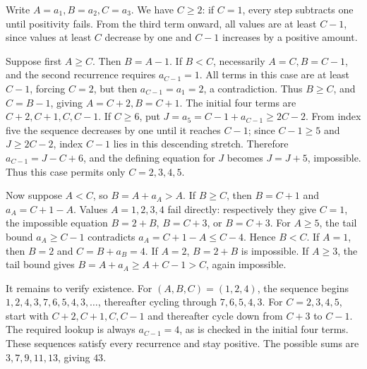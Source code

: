 Write $A=a_1,B=a_2,C=a_3$. We have $C\ge2$: if $C=1$, every step subtracts one until positivity fails. From the third term onward, all values are at least $C-1$, since values at least $C$ decrease by one and $C-1$ increases by a positive amount.

Suppose first $A\ge C$. Then $B=A-1$. If $B<C$, necessarily $A=C,B=C-1$, and the second recurrence requires $a_{C-1}=1$. All terms in this case are at least $C-1$, forcing $C=2$, but then $a_{C-1}=a_1=2$, a contradiction. Thus $B\ge C$, and $C=B-1$, giving $A=C+2,B=C+1$.
The initial four terms are $C+2,C+1,C,C-1$. If $C\ge6$, put $J=a_5=C-1+a_{C-1}\ge2C-2$. From index five the sequence decreases by one until it reaches $C-1$; since $C-1\ge5$ and $J\ge2C-2$, index $C-1$ lies in this descending stretch. Therefore $a_{C-1}=J-C+6$, and the defining equation for $J$ becomes $J=J+5$, impossible. Thus this case permits only $C=2,3,4,5$.

Now suppose $A<C$, so $B=A+a_A>A$. If $B\ge C$, then $B=C+1$ and $a_A=C+1-A$. Values $A=1,2,3,4$ fail directly: respectively they give $C=1$, the impossible equation $B=2+B$, $B=C+3$, or $B=C+3$. For $A\ge5$, the tail bound $a_A\ge C-1$ contradicts $a_A=C+1-A\le C-4$. Hence $B<C$.
If $A=1$, then $B=2$ and $C=B+a_B=4$. If $A=2$, $B=2+B$ is impossible. If $A\ge3$, the tail bound gives $B=A+a_A\ge A+C-1>C$, again impossible.

It remains to verify existence. For $(A,B,C)=(1,2,4)$, the sequence begins $1,2,4,3,7,6,5,4,3,\ldots$, thereafter cycling through $7,6,5,4,3$. For $C=2,3,4,5$, start with $C+2,C+1,C,C-1$ and thereafter cycle down from $C+3$ to $C-1$. The required lookup is always $a_{C-1}=4$, as is checked in the initial four terms. These sequences satisfy every recurrence and stay positive.
The possible sums are $3,7,9,11,13$, giving $\boxed{43}$.
